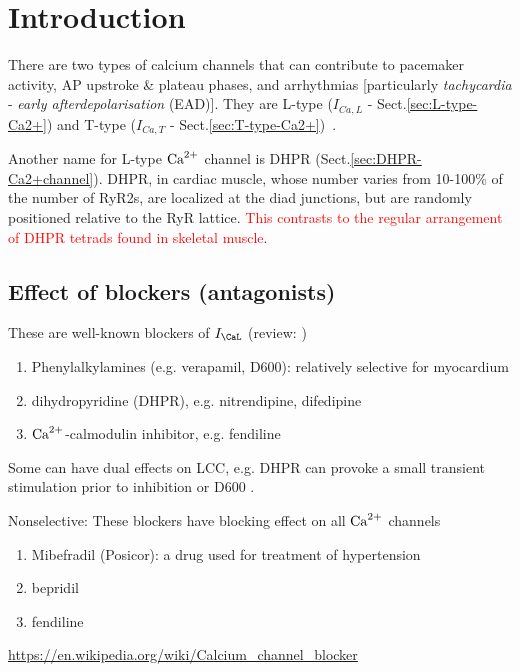 \citep{schroder1998, findlay2002, peterson1999}


\section{Introduction}
\label{sec:introduction-10}

There are two types of calcium channels that can contribute to pacemaker
activity, AP upstroke \& plateau phases, and arrhythmias [particularly {\it
tachycardia} - {\it early afterdepolarisation} (EAD)]. They are L-type
($I_{Ca,L}$ - Sect.\ref{sec:L-type-Ca2+}) and T-type ($I_{Ca,T}$
- Sect.\ref{sec:T-type-Ca2+})~\citep{bers2008cca}.

Another name for L-type ${\text{Ca}^{2+}}$ channel is DHPR (Sect.\ref{sec:DHPR-Ca2+channel}).
DHPR, in cardiac muscle, whose number varies from 10-100\% of the
number of RyR2s, are localized at the diad junctions, but are randomly
positioned relative to the RyR lattice. \textcolor{red}{This contrasts
to the regular arrangement of DHPR tetrads found in skeletal
muscle}. 


\subsection{Effect of blockers (antagonists)}

These are well-known blockers of $I_\CaL$ (review: \citep{janis1983, janis1984}) 
\begin{enumerate}
  \item Phenylalkylamines (e.g. verapamil, D600): relatively selective for
  myocardium
  \item dihydropyridine (DHPR), e.g. nitrendipine, difedipine
  \item ${\text{Ca}^{2+}}$-calmodulin inhibitor, e.g. fendiline
\end{enumerate}
Some can have dual effects on LCC, e.g. DHPR can provoke a small transient
stimulation prior to inhibition \citep{hess1984, brown1984, brown1985} or D600
\citep{mcdonald1989}.

Nonselective: These blockers have blocking effect on all ${\text{Ca}^{2+}}$ channels
\begin{enumerate}
  \item Mibefradil (Posicor): a drug used for treatment of hypertension
  \item  bepridil
  \item fendiline
\end{enumerate}

\url{https://en.wikipedia.org/wiki/Calcium_channel_blocker}

